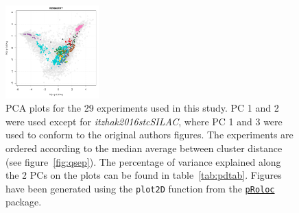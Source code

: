 \documentclass[12pt]{article}\usepackage[]{graphicx}\usepackage[]{color}
\newcommand{\Rpackage}[1]{\texttt{#1}}
\newcommand\Biocpkg[1]{%
  {\href{http://bioconductor.org/packages/#1}%
    {\Rpackage{#1}}}}
\begin{document}
\begin{appendices}
\begin{figure}[htb]
  \includegraphics[width = 0.32\textwidth]{./figure/figpca-28.pdf}
  \caption{PCA plots for the 29 experiments used in
    this study. PC 1 and 2 were used except for
    \textit{itzhak2016stcSILAC}, where PC 1 and 3 were used to conform
    to the original authors figures. The experiments are ordered
    according to the median average between cluster distance (see
    figure~\ref{fig:qsep}). The percentage of variance explained along
    the 2 PCs on the plots can be found in
    table~\ref{tab:pdtab}. Figures have been generated using the
    \texttt{plot2D} function from the \Biocpkg{pRoloc} package.}
  \ContinuedFloat
  \label{fig:pca}
\end{figure}


\end{appendices}
\end{document}
